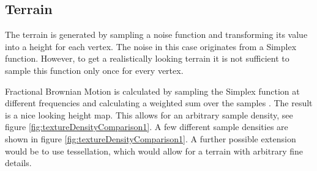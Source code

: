 \newpage
\subsection{Terrain}
The terrain is generated by sampling a noise function and transforming its value into a height for each vertex. The noise in this case originates from a Simplex function. However, to get a realistically looking terrain it is not sufficient to sample this function only once for every vertex.

Fractional Brownian Motion is calculated by sampling the Simplex function at different frequencies and calculating a weighted sum over the samples \cite{FracBrownMotion}. The result is a nice looking height map. This allows for an arbitrary sample density, see figure \ref{fig:textureDensityComparison1}. A few different sample densities are shown in figure \ref{fig:textureDensityComparison1}. A further possible extension would be to use tessellation, which would allow for a terrain with arbitrary fine details.  

